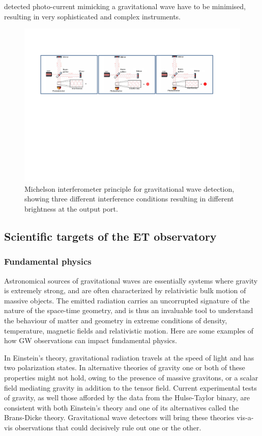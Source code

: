 {detected photo-current mimicking a gravitational wave have to be minimised, 
resulting in very sophisticated and complex instruments.
\begin{figure}[H]
		\includegraphics[width=\textwidth]{Sec_Introduction/GWdetection.pdf}
\vskip 0.3cm
	\caption{Michelson interferometer principle for gravitational wave 
	detection, showing three different interference conditions resulting in 
	different brightness at the output port.}
	\label{fig:GWdetection}
\vskip -0.6cm
\end{figure}
}


%
\subsection{Scientific targets of the ET observatory}
\subsubsection{Fundamental physics}
\label{ScienceCase:FundamentalPhysics}
Astronomical sources of gravitational waves are essentially
systems where gravity is extremely strong, and are often
characterized by relativistic bulk motion of massive objects.
The emitted radiation carries an uncorrupted signature of the
nature of the space-time geometry, and is thus an invaluable
tool to understand the behaviour of matter and geometry in
extreme conditions of density, temperature, magnetic fields
and relativistic motion. Here are some examples of how GW
observations can impact fundamental physics.

In Einstein's theory, gravitational radiation travels at the speed 
of light and has two polarization states. In alternative theories 
of gravity one or both of these properties might not hold, owing 
to the presence of massive gravitons, or a scalar field mediating 
gravity in addition to the tensor field. Current experimental
tests of gravity, as well those afforded by the data from the
Hulse-Taylor binary, are consistent with both Einstein's theory
and one of its alternatives called the Brans-Dicke theory.
Gravitational wave detectors will bring these theories
vis-a-vis observations that could decisively rule out one
or the other.

